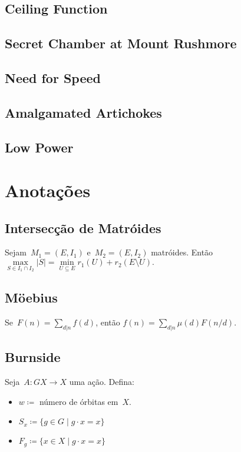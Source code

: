 \documentclass[a4paper,oneside]{article}
\begin{document}
\subsection{Ceiling Function}


\subsection{Secret Chamber at Mount Rushmore}


\subsection{Need for Speed}


\subsection{Amalgamated Artichokes}


\subsection{Low Power}


\section{Anotações}
\subsection{Intersecção de Matróides}
Sejam~$M_1 = (E, I_1)$ e~$M_2 = (E, I_2)$ matróides. Então
$ \max\limits_{S \in I_1 \cap I_2}{|S|} = \min\limits_{U \subseteq E}{r_1(U) + r_2(E \setminus U)}. $

\subsection{Möebius}
Se~$F(n) = \sum\limits_{d | n}{f(d)}$, então
$f(n) = \sum\limits_{d | n}{\mu(d) F(n / d)}.$

\subsection{Burnside}
Seja~$A \colon GX \rightarrow X$ uma ação. Defina:
\begin{itemize}
\item $w \coloneqq $ número de órbitas em~$X$.
\item $S_x \coloneqq \{g \in G \mid g \cdot x = x \}$
\item $F_g \coloneqq \{x \in X \mid g \cdot x = x \} $
\end{itemize}
\end{document}
